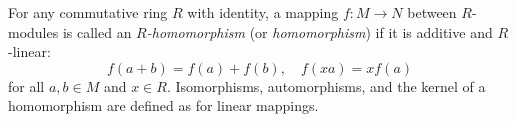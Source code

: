 For any commutative ring $R$ with identity, a mapping $f: M \to N$ between $R$-modules is called an \emph{$R$-homomorphism} (or \emph{homomorphism}) if it is additive and $R$-linear:
$$f(a+b) = f(a) + f(b), \quad f(xa) = xf(a)$$
for all $a, b \in M$ and $x \in R$. Isomorphisms, automorphisms, and the kernel of a homomorphism are defined as for linear mappings.
